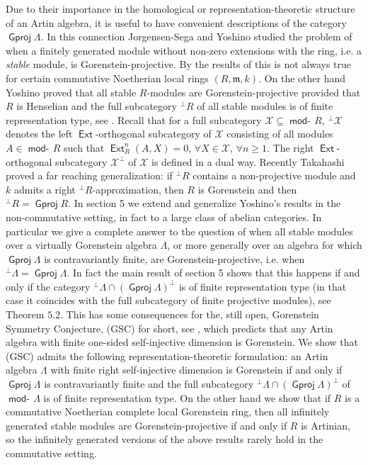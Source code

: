 \documentclass[oneside, a4paper,reqno]{amsart}
\numberwithin{equation}{section}
\theoremstyle{definition}
\begin{document}
 Due to their  importance in the homological or
representation-theoretic structure of an Artin algebra, it is useful
to have convenient descriptions of the category ${\operatorname{\mathsf{Gproj}}\nolimits}\Lambda$. In
this connection Jorgensen-Sega \cite{JS} and Yoshino \cite{Yoshino}
studied the problem of when a finitely generated module without
non-zero extensions with the ring, i.e. a {\em stable} module, is
Gorenstein-projective. By the results of \cite{JS} this is not
always true for certain commutative Noetherian local rings
$(R,\mathfrak{m},k)$. On the other hand Yoshino proved that all
stable $R$-modules are Gorenstein-projective provided that $R$ is
Henselian and the full subcategory ${^{\bot}}R$ of all stable
modules is of finite representation type, see \cite{Yoshino}. Recall
that for a full subcategory ${\mathcal X} \subseteq \operatorname*{\mathsf{mod}-\!} R$, ${^{\bot}}{\mathcal X}$
denotes the left $\operatorname*{\mathsf{Ext}}$-orthogonal subcategory of ${\mathcal X}$ consisting of
all modules $A \in \operatorname*{\mathsf{mod}-\!} R$ such that $\operatorname*{\mathsf{Ext}}^{n}_{R}(A,X) = 0$,
$\forall X \in {\mathcal X}$, $\forall n \geq 1$. The right $\operatorname*{\mathsf{Ext}}$-orthogonal
subcategory ${\mathcal X}^{\bot}$ of ${\mathcal X}$ is defined in a dual way. Recently
Takahashi \cite{Takahashi} proved a far reaching generalization: if
${^{\bot}}R$ contains a non-projective module and $k$ admits a right
${^{\bot}}R$-approximation, then $R$ is Gorenstein and then
${^{\bot}}R = {\operatorname{\mathsf{Gproj}}\nolimits} R$. In section 5 we extend and generalize
Yoshino's results in the non-commutative setting, in fact to a large
class of abelian categories.  In particular  we give a complete
answer to the question of when all stable modules over a virtually
Gorenstein algebra $\Lambda$, or more generally over an algebra for
which ${\operatorname{\mathsf{Gproj}}\nolimits}\Lambda$ is contravariantly finite, are
Gorenstein-projective, i.e. when ${^{\bot}}\Lambda = {\operatorname{\mathsf{Gproj}}\nolimits}\Lambda$.
In fact the main result of section 5 shows that this happens if and
only if the category ${^{\bot}}\Lambda \cap ({\operatorname{\mathsf{Gproj}}\nolimits}\Lambda)^{\bot}$
is of finite representation type (in that case it coincides with the
full subcategory of finite projective modules), see Theorem $5.2$.
This has some consequences for the, still open, Gorenstein Symmetry
Conjecture, \textsf{(GSC)} for short, see \cite{BR, ARS, B:cm},
which predicts that any Artin algebra with finite one-sided
self-injective dimension is Gorenstein. We show that \textsf{(GSC)}
admits the following representation-theoretic formulation:  an Artin
algebra  $\Lambda$ with finite right self-injective dimension is
Gorenstein if and only if ${\operatorname{\mathsf{Gproj}}\nolimits}\Lambda$ is contravariantly finite
and the full subcategory ${^{\bot}}\Lambda \cap
({\operatorname{\mathsf{Gproj}}\nolimits}\Lambda)^{\bot}$ of $\operatorname*{\mathsf{mod}-\!}\Lambda$  is of finite
representation type. On the other hand we show that if $R$ is a
commutative Noetherian complete local Gorenstein ring, then all
infinitely generated stable modules are Gorenstein-projective if and
only if $R$ is Artinian, so the infinitely generated versions of the
above results rarely hold in the commutative setting.
\end{document}
